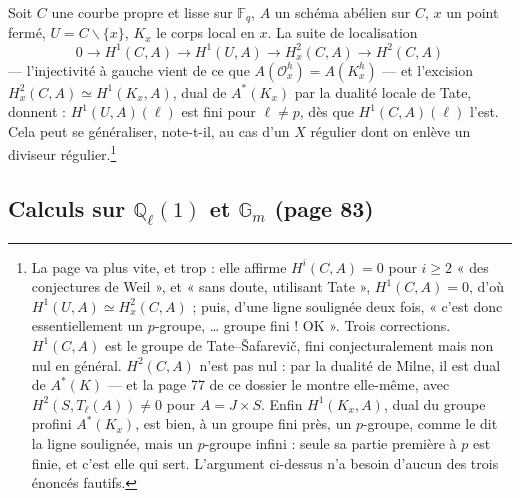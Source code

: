 \documentclass[11pt,a4paper]{article}
\begin{document}
Soit $C$ une courbe propre et lisse sur $\mathbb{F}_{q}$, $A$ un schéma abélien
sur $C$, $x$ un point fermé, $U = C \smallsetminus \{x\}$, $K_{x}$ le corps
local en $x$. La suite de localisation
\[
0 \longrightarrow H^{1}(C, A) \longrightarrow H^{1}(U, A) \longrightarrow
H^{2}_{x}(C, A) \longrightarrow H^{2}(C, A)
\]
--- l'injectivité à gauche vient de ce que $A(\mathcal{O}^{h}_{x}) =
A(K^{h}_{x})$ --- et l'excision $H^{2}_{x}(C, A) \simeq H^{1}(K_{x}, A)$, dual de
$A^{*}(K_{x})$ par la dualité locale de Tate, donnent : $H^{1}(U, A)(\ell)$ est fini
pour $\ell \neq p$, dès que $H^{1}(C, A)(\ell)$ l'est. Cela peut se généraliser,
note-t-il, au cas d'un $X$ régulier dont on enlève un diviseur
régulier.\footnote{La page va plus vite, et trop : elle affirme $H^{i}(C, A) = 0$
pour $i \geqslant 2$ « des conjectures de Weil », et « sans doute, utilisant Tate »,
$H^{1}(C, A) = 0$, d'où $H^{1}(U, A) \simeq H^{2}_{x}(C, A)$ ; puis, d'une ligne
soulignée deux fois, « c'est donc essentiellement un $p$-groupe, … groupe fini !
OK ». Trois corrections. $H^{1}(C, A)$ est le groupe de Tate--Šafarevič, fini
conjecturalement mais non nul en général. $H^{2}(C, A)$ n'est pas nul : par la
dualité de Milne, il est dual de $A^{*}(K)$ --- et la page 77 de ce dossier le
montre elle-même, avec $H^{2}(S, T_{\ell}(A)) \neq 0$ pour $A = J \times S$. Enfin
$H^{1}(K_{x}, A)$, dual du groupe profini $A^{*}(K_{x})$, est bien, à un groupe
fini près, un $p$-groupe, comme le dit la ligne soulignée, mais un $p$-groupe
infini : seule sa partie première à $p$ est finie, et c'est elle qui sert. L'argument ci-dessus n'a besoin d'aucun des trois
énoncés fautifs.}

\subsection*{Calculs sur $\mathbb{Q}_{\ell}(1)$ et $\mathbb{G}_{m}$ (page 83)}
\end{document}
